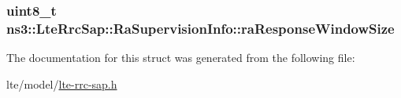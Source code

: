 \subsubsection[{\texorpdfstring{ra\+Response\+Window\+Size}{raResponseWindowSize}}]{\setlength{\rightskip}{0pt plus 5cm}uint8\+\_\+t ns3\+::\+Lte\+Rrc\+Sap\+::\+Ra\+Supervision\+Info\+::ra\+Response\+Window\+Size}\hypertarget{structns3_1_1LteRrcSap_1_1RaSupervisionInfo_ae1c706fe6418419f8693121b6a5a87b8}{}\label{structns3_1_1LteRrcSap_1_1RaSupervisionInfo_ae1c706fe6418419f8693121b6a5a87b8}


The documentation for this struct was generated from the following file\+:\begin{DoxyCompactItemize}
\item 
lte/model/\hyperlink{lte-rrc-sap_8h}{lte-\/rrc-\/sap.\+h}\end{DoxyCompactItemize}
